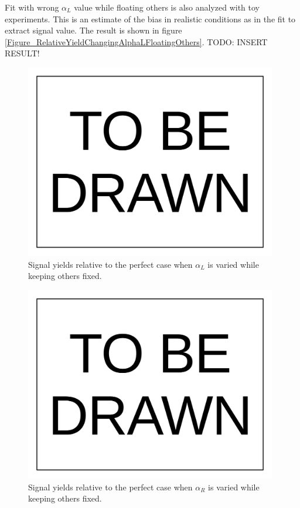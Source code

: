 \documentclass[10pt,a4paper,onecolumn]{article}
\begin{document}
Fit with wrong $\alpha_L$ value while floating others is also analyzed with toy experiments.
This is an estimate of the bias in realistic conditions as in the fit to extract signal value.
The result is shown in figure \ref{Figure_RelativeYieldChangingAlphaLFloatingOthers}.
TODO: INSERT RESULT!

\begin{figure}
\includegraphics[width=110mm]{ToBeDrawn.pdf}
\caption{Signal yields relative to the perfect case when $\alpha_L$ is varied while keeping others fixed.}
\label{Figure_RelativeYieldChangingAlphaLOnly}
\end{figure}

\begin{figure}
\includegraphics[width=110mm]{ToBeDrawn.pdf}
\caption{Signal yields relative to the perfect case when $\alpha_R$ is varied while keeping others fixed.}
\label{Figure_RelativeYieldChangingAlphaROnly}
\end{figure}
\end{document}
